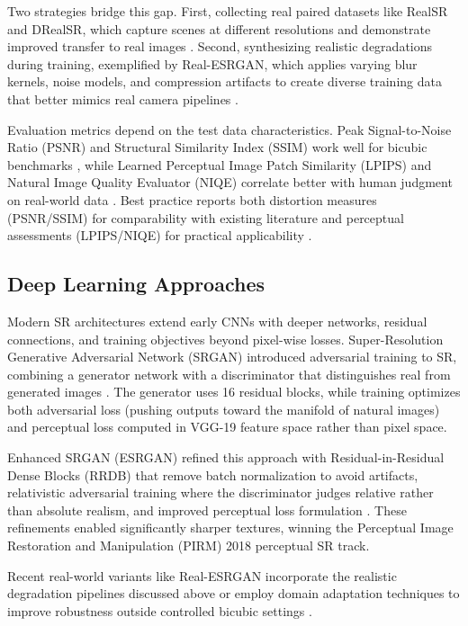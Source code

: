 Two strategies bridge this gap. First, collecting real paired datasets like RealSR and DRealSR, which capture scenes at different resolutions and demonstrate improved transfer to real images \cite{Cai2019RealSR,Wei2020DRealSR}. Second, synthesizing realistic degradations during training, exemplified by Real-ESRGAN, which applies varying blur kernels, noise models, and compression artifacts to create diverse training data that better mimics real camera pipelines \cite{Wang2021RealESRGAN}.

Evaluation metrics depend on the test data characteristics. Peak Signal-to-Noise Ratio (PSNR) and Structural Similarity Index (SSIM) work well for bicubic benchmarks \cite{Wang2004SSIM}, while Learned Perceptual Image Patch Similarity (LPIPS) and Natural Image Quality Evaluator (NIQE) correlate better with human judgment on real-world data \cite{Zhang2018LPIPS,Mittal2013NIQE}. Best practice reports both distortion measures (PSNR/SSIM) for comparability with existing literature and perceptual assessments (LPIPS/NIQE) for practical applicability \cite{Lugmayr2020NTIRE}.

\subsection{Deep Learning Approaches}

Modern SR architectures extend early CNNs with deeper networks, residual connections, and training objectives beyond pixel-wise losses. Super-Resolution Generative Adversarial Network (SRGAN) introduced adversarial training to SR, combining a generator network with a discriminator that distinguishes real from generated images \cite{Ledig2017SRGAN}. The generator uses 16 residual blocks, while training optimizes both adversarial loss (pushing outputs toward the manifold of natural images) and perceptual loss computed in VGG-19 feature space rather than pixel space.

Enhanced SRGAN (ESRGAN) refined this approach with Residual-in-Residual Dense Blocks (RRDB) that remove batch normalization to avoid artifacts, relativistic adversarial training where the discriminator judges relative rather than absolute realism, and improved perceptual loss formulation \cite{Wang2018ESRGAN}. These refinements enabled significantly sharper textures, winning the Perceptual Image Restoration and Manipulation (PIRM) 2018 perceptual SR track.

Recent real-world variants like Real-ESRGAN incorporate the realistic degradation pipelines discussed above or employ domain adaptation techniques to improve robustness outside controlled bicubic settings \cite{Wang2021RealESRGAN,Cai2019RealSR}.

